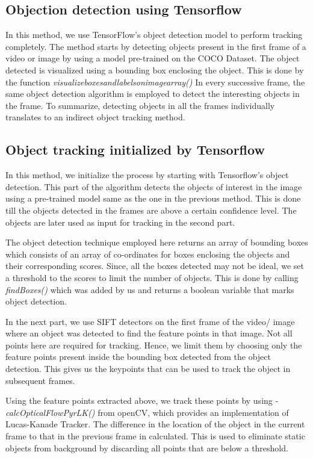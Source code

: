 \documentclass[10pt,twocolumn,letterpaper]{article}
\begin{document}
\subsection{Objection detection using Tensorflow}
In this method, we use TensorFlow's object detection model to perform tracking completely. The method starts by detecting objects present in the first frame of a video or image by using a model pre-trained on the COCO Dataset. The object detected is visualized using a bounding box enclosing the object. This is done by the function  \textit{visualize\textunderscore boxes\textunderscore and\textunderscore labels\textunderscore on\textunderscore image\textunderscore array()}  In every successive frame, the same object detection algorithm is employed to detect the interesting objects in the frame. To summarize, detecting  objects in all the frames individually translates to an indirect object tracking method.

\subsection{Object tracking initialized by Tensorflow}

In this method, we initialize the process by starting with Tensorflow's object detection. This part of the algorithm detects the objects of interest in the image using a pre-trained model same as the one in the previous method. This is done till the objects detected in the frames are above a certain confidence level. The objects are later used as input for tracking in the second part.

The object detection technique employed here returns an array of bounding boxes which consists of an array of co-ordinates for boxes enclosing the objects and their corresponding scores. Since, all the boxes detected may not be ideal, we set a threshold to the scores to limit the number of objects. This is done by calling \textit{findBoxes()} which was added by us and returns a boolean variable that marks object detection. 

In the next part, we use SIFT detectors on the first frame of the video/ image where an object was detected to find the feature points in that image. Not all points here are required for tracking. Hence, we limit them by choosing only the feature points present inside the bounding box detected from the object detection. This gives us the keypoints that can be used to track the object in subsequent frames.

Using the feature points extracted above, we track these points by using - \textit{calcOpticalFlowPyrLK()} from openCV, which provides an implementation of Lucas-Kanade Tracker. The difference in the location of the object in the current frame to that in the previous frame in calculated. This is used to eliminate static objects from background by discarding all points that are below a threshold. 
\end{document}
